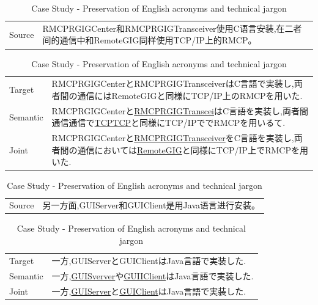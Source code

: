 \vspace{0.1cm}
\begin{table}[h]
    \centering

    \begin{CJK}{UTF8}{gbsn}
        \begin{tabularx}{\textwidth}{p{1.2cm}b}\toprule
            Source & RMCPRGIGCenter和RMCPRGIGTransceiver使用C语言安装,在二者间的通信中和RemoteGIG同样使用TCP/IP上的RMCP。 \\
        \end{tabularx}
    \end{CJK}

    \begin{CJK}{UTF8}{ipxm}
        \begin{tabularx}{\textwidth}{p{1.2cm}b}
            Target & RMCPRGIGCenterとRMCPRGIGTransceiverはC言語で実装し,両者間の通信にはRemoteGIGと同様にTCP/IP上のRMCPを用いた. \\
            Semantic & RMCPRGIGCenterと\underline{RMCPRGIGTranscei}はC言語を実装し,両者間通信通信で\underline{TCPTCP}と同様にTCP/IPででRMCPを用いるて. \\
            Joint & RMCPRGIGCenterと\underline{RMCPRGIGTransceiver}をC言語を実装し,両者間の通信においては\underline{RemoteGIG}と同様にTCP/IP上でRMCPを用いた. \\\midrule
        \end{tabularx}
    \end{CJK}

    \begin{CJK}{UTF8}{gbsn}
        \begin{tabularx}{\textwidth}{p{1.2cm}b}
            Source & 另一方面,GUIServer和GUIClient是用Java语言进行安装。 \\
        \end{tabularx}
    \end{CJK}

    \begin{CJK}{UTF8}{ipxm}
        \begin{tabularx}{\textwidth}{p{1.2cm}b}
            Target & 一方,GUIServerとGUIClientはJava言語で実装した. \\
            Semantic & 一方,\underline{GUISverver}や\underline{GUIIClient}はJava言語で実装した. \\
            Joint & 一方,\underline{GUIServer}と\underline{GUIClient}はJava言語で実装した. \\\midrule
        \end{tabularx}
    \end{CJK}

    \caption{Case Study - Preservation of English acronyms and technical jargon}
    \label{tab:case_study3}
\end{table}

